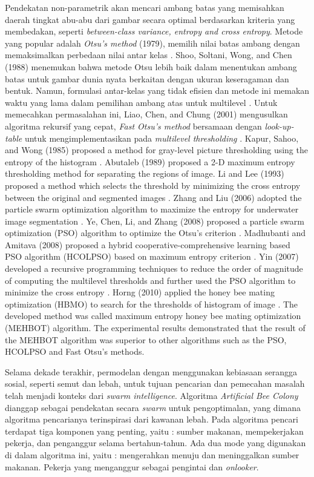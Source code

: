 \documentclass[a4paper, 10pt, conference]{ieeeconf}
\begin{document}
Pendekatan non-parametrik akan mencari ambang batas yang memisahkan daerah tingkat abu-abu dari gambar secara optimal berdasarkan kriteria yang membedakan, seperti \textit{between-class variance, entropy and cross entropy}. 
Metode yang popular adalah \textit{Otsu's method} (1979), memilih nilai batas ambang dengan memaksimalkan perbedaan nilai antar kelas \cite{c4}. 
Shoo, Soltani, Wong, and Chen (1988) menemukan bahwa metode Otsu lebih baik dalam menentukan ambang batas untuk gambar dunia nyata berkaitan dengan ukuran keseragaman dan bentuk. Namun, formulasi antar-kelas yang tidak efisien dan metode ini memakan waktu yang lama dalam pemilihan ambang atas untuk multilevel \cite{c5}. 
Untuk memecahkan permasalahan ini, Liao, Chen, and Chung (2001) mengusulkan algoritma rekursif yang cepat, \textit{Fast Otsu's method} bersamaan dengan \textit{look-up-table} untuk mengimplementasikan pada \textit{multilevel thresholding} \cite{c6}.
Kapur, Sahoo, and Wong (1985) proposed a method for gray-level picture thresholding using the entropy of the histogram \cite{c7}. 
Abutaleb (1989) proposed a 2-D maximum entropy thresholding method for separating the regions of image. 
Li and Lee (1993) proposed a method which selects the threshold by minimizing the cross entropy between the original and segmented images \cite{c8}.
Zhang and Liu (2006) adopted the particle swarm optimization algorithm to maximize the entropy for underwater image segmentation \cite{c9}. 
Ye, Chen, Li, and Zhang (2008) proposed a particle swarm optimization (PSO) algorithm to optimize the Otsu’s criterion \cite{c10}.
Madhubanti and Amitava (2008) proposed a hybrid cooperative-comprehensive learning based PSO algorithm (HCOLPSO) based on maximum entropy criterion \cite{c11}.
Yin (2007) developed a recursive programming techniques to reduce the order of magnitude of computing the multilevel thresholds and further used the PSO algorithm to minimize the cross entropy \cite{c12}. 
Horng (2010) applied the honey bee mating optimization (HBMO) to search for the thresholds of histogram of image \cite{C13}. The developed method was called maximum entropy honey bee mating optimization (MEHBOT) algorithm. The experimental results demonstrated that the result of the MEHBOT algorithm was superior to other algorithms such as the PSO, HCOLPSO and Fast Otsu’s methods. \par

Selama dekade terakhir, permodelan dengan menggunakan kebiasaan serangga sosial, seperti semut dan lebah, untuk tujuan pencarian dan pemecahan masalah telah menjadi konteks dari \textit{swarm intelligence}. Algoritma \textit{Artificial Bee Colony} dianggap sebagai pendekatan secara \textit{swarm} untuk pengoptimalan, yang dimana algoritma pencarianya terinspirasi dari kawanan lebah. Pada algoritma pencari terdapat tiga komponen yang penting, yaitu : sumber makanan, mempekerjakan pekerja, dan penganggur selama bertahun-tahun. Ada dua mode yang digunakan di dalam algoritma ini, yaitu : mengerahkan menuju dan meninggalkan sumber makanan. Pekerja yang menganggur sebagai pengintai dan \textit{onlooker}. \par
\end{document}
